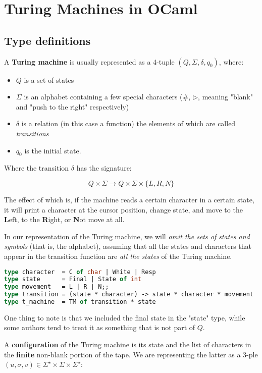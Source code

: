 \documentclass[a4paper,10pt]{article}
\begin{document}
\section{Turing Machines in OCaml}
\subsection{Type definitions}
A \textbf{Turing machine} is usually represented as a 4-tuple $(Q, \Sigma, \delta, q_0)$, where:
\begin{itemize}
    \item $Q$ is a set of states
    \item $\Sigma$ is an alphabet containing a few special characters ($\#$, $\triangleright$, meaning "blank" and "push to the right" respectively)
    \item $\delta$ is a relation (in this case a function) the elements of which are called \emph{transitions}
    \item $q_0$ is the initial state.
\end{itemize}

Where the transition $\delta$ has the signature:

\[ Q \times \Sigma \to Q \times \Sigma \times \{L, R, N\} \]

The effect of which is, if the machine reads a certain character in a certain state, it will print a character at the cursor position, change state, and move to the \textbf{L}eft, to the \textbf{R}ight, or \textbf{N}ot move at all.\smallskip

In our representation of the Turing machine, we will \emph{omit the sets of states and symbols} (that is, the alphabet), assuming that all the states and characters that appear in the transition function are \emph{all the states} of the Turing machine.



\begin{lstlisting}[language = ml]
type character  = C of char | White | Resp
type state      = Final | State of int
type movement   = L | R | N;;
type transition = (state * character) -> state * character * movement
type t_machine  = TM of transition * state
\end{lstlisting}

One thing to note is that we included the final state in the "state" type, while some authors tend to treat it as something that is not part of $Q$.\medskip

A \textbf{configuration} of the Turing machine is its state and the list of characters in the \textbf{finite} non-blank portion of the tape. We are representing the latter as a 3-ple $(u, \sigma, v) \in \Sigma^\star \times \Sigma \times \Sigma^\star$:
\end{document}
